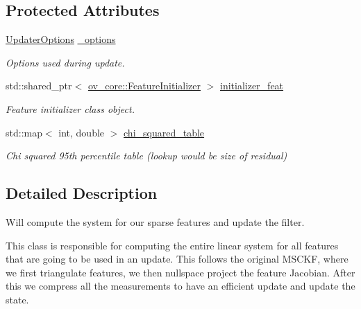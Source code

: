 \subsection*{Protected Attributes}
\begin{DoxyCompactItemize}
\item 
\mbox{\label{classov__msckf_1_1UpdaterMSCKF_ab82434d9a42bbbf4a19dd049e8187c9d}} 
\hyperlink{structov__msckf_1_1UpdaterOptions}{Updater\+Options} \hyperlink{classov__msckf_1_1UpdaterMSCKF_ab82434d9a42bbbf4a19dd049e8187c9d}{\+\_\+options}
\begin{DoxyCompactList}\small\item\em Options used during update. \end{DoxyCompactList}\item 
\mbox{\label{classov__msckf_1_1UpdaterMSCKF_a828b58318b6a4fcbf0f18ca37371e997}} 
std\+::shared\+\_\+ptr$<$ \hyperlink{classov__core_1_1FeatureInitializer}{ov\+\_\+core\+::\+Feature\+Initializer} $>$ \hyperlink{classov__msckf_1_1UpdaterMSCKF_a828b58318b6a4fcbf0f18ca37371e997}{initializer\+\_\+feat}
\begin{DoxyCompactList}\small\item\em Feature initializer class object. \end{DoxyCompactList}\item 
\mbox{\label{classov__msckf_1_1UpdaterMSCKF_a1dec60a307dd3a6867c44b3af988603e}} 
std\+::map$<$ int, double $>$ \hyperlink{classov__msckf_1_1UpdaterMSCKF_a1dec60a307dd3a6867c44b3af988603e}{chi\+\_\+squared\+\_\+table}
\begin{DoxyCompactList}\small\item\em Chi squared 95th percentile table (lookup would be size of residual) \end{DoxyCompactList}\end{DoxyCompactItemize}


\subsection{Detailed Description}
Will compute the system for our sparse features and update the filter. 

This class is responsible for computing the entire linear system for all features that are going to be used in an update. This follows the original M\+S\+C\+KF, where we first triangulate features, we then nullspace project the feature Jacobian. After this we compress all the measurements to have an efficient update and update the state. 

